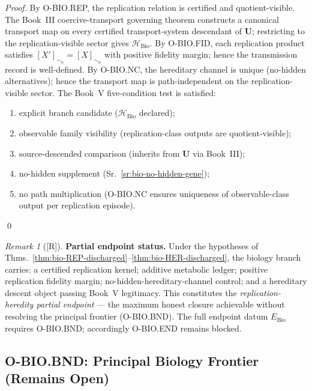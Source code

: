 \documentclass[12pt,oneside]{amsbook}
\theoremstyle{plain}
\theoremstyle{definition}
\theoremstyle{remark}
\newtheorem{remark}[theorem]{Remark}
\newcommand{\status}[1]{\textup{[#1]}}
\begin{document}
\begin{proof}
By O-BIO.REP, the replication relation is certified and
quotient-visible. The Book~III coercive-transport governing theorem
constructs a canonical transport map on every certified
transport-system descendant of $\mathbf{U}$; restricting to the
replication-visible sector gives $\mathcal{H}_{\mathrm{Bio}}$. By
O-BIO.FID, each replication product satisfies
$[X']_{\sim_n} = [X]_{\sim_n}$ with positive fidelity margin; hence
the transmission record is well-defined. By O-BIO.NC, the
hereditary channel is unique (no-hidden alternatives); hence the
transport map is path-independent on the replication-visible sector.
The Book~V five-condition test is satisfied:
\begin{enumerate}[label=\textup{(\roman*)}]
 \item explicit branch candidate ($\mathcal{H}_{\mathrm{Bio}}$ declared);
 \item observable family visibility (replication-class outputs are
 quotient-visible);
 \item source-descended comparison (inherits from $\mathbf{U}$ via
 Book~III);
 \item no-hidden supplement (Sr.~\ref{sr:bio-no-hidden-gene});
 \item no path multiplication (O-BIO.NC ensures uniqueness of
 observable-class output per replication episode).
\end{enumerate}
\qed
\end{proof}

\begin{remark}[\status{R}]\label{rem:bio-partial-endpoint}
\textbf{Partial endpoint status.}
Under the hypotheses of
Thms.~\ref{thm:bio-REP-discharged}--\ref{thm:bio-HER-discharged},
the biology branch carries: a certified replication kernel; additive
metabolic ledger; positive replication fidelity margin; no-hidden-hereditary-channel control; and a hereditary descent object passing
Book~V legitimacy. This constitutes the \emph{replication-heredity
partial endpoint} --- the maximum honest closure achievable without
resolving the principal frontier (O-BIO.BND). The full endpoint
datum $E_{\mathrm{Bio}}$ requires O-BIO.BND; accordingly O-BIO.END
remains blocked.
\end{remark}

\subsection{O-BIO.BND: Principal Biology Frontier (Remains Open)}
\label{sec:bio-BND-frontier}
\end{document}
